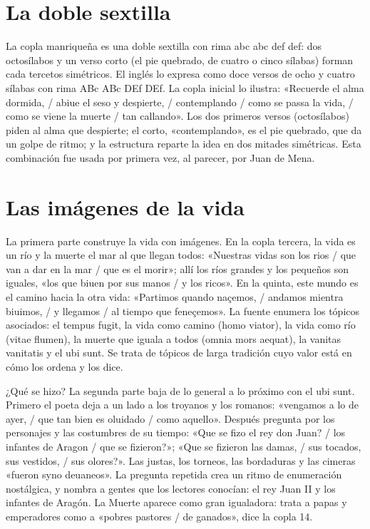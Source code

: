 \documentclass{book}
\begin{document}

\section{La doble sextilla}

La copla manriqueña es una doble sextilla con rima abc abc def def: dos octosílabos y un verso corto (el pie quebrado, de cuatro o cinco sílabas) forman cada tercetos simétricos. El inglés lo expresa como doce versos de ocho y cuatro sílabas con rima ABc ABc DEf DEf. La copla inicial lo ilustra: «Recuerde el alma dormida, / abiue el seso y despierte, / contemplando / como se passa la vida, / como se viene la muerte / tan callando». Los dos primeros versos (octosílabos) piden al alma que despierte; el corto, «contemplando», es el pie quebrado, que da un golpe de ritmo; y la estructura reparte la idea en dos mitades simétricas. Esta combinación fue usada por primera vez, al parecer, por Juan de Mena.


\section{Las imágenes de la vida}

La primera parte construye la vida con imágenes. En la copla tercera, la vida es un río y la muerte el mar al que llegan todos: «Nuestras vidas son los rios / que van a dar en la mar / que es el morir»; allí los ríos grandes y los pequeños son iguales, «los que biuen por sus manos / y los ricos». En la quinta, este mundo es el camino hacia la otra vida: «Partimos quando naçemos, / andamos mientra biuimos, / y llegamos / al tiempo que feneçemos». La fuente enumera los tópicos asociados: el tempus fugit, la vida como camino (homo viator), la vida como río (vitae flumen), la muerte que iguala a todos (omnia mors aequat), la vanitas vanitatis y el ubi sunt. Se trata de tópicos de larga tradición cuyo valor está en cómo los ordena y los dice.


¿Qué se hizo?
La segunda parte baja de lo general a lo próximo con el ubi sunt. Primero el poeta deja a un lado a los troyanos y los romanos: «vengamos a lo de ayer, / que tan bien es oluidado / como aquello». Después pregunta por los personajes y las costumbres de su tiempo: «Que se fizo el rey don Juan? / los infantes de Aragon / que se fizieron?»; «Que se fizieron las damas, / sus tocados, sus vestidos, / sus olores?». Las justas, los torneos, las bordaduras y las cimeras «fueron syno deuaneos». La pregunta repetida crea un ritmo de enumeración nostálgica, y nombra a gentes que los lectores conocían: el rey Juan II y los infantes de Aragón. La Muerte aparece como gran igualadora: trata a papas y emperadores como a «pobres pastores / de ganados», dice la copla 14.
\end{document}
